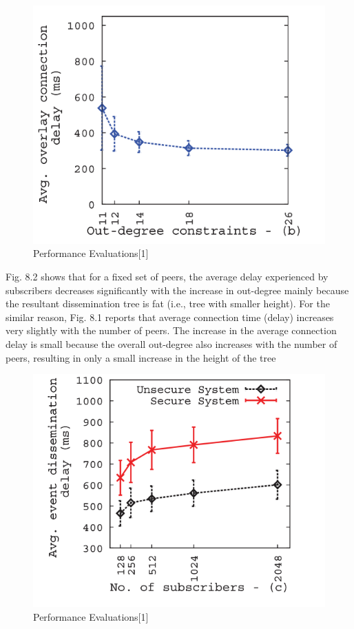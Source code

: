 \documentclass[MTech]{iitmdiss}
\begin{document}
\begin{figure}[htp]
\centering
\includegraphics[scale=0.6]{perf2.png}
\caption{\label{a}Performance Evaluations[1] }
\end{figure}
Fig. 8.2 shows that for a fixed set of peers, the average delay
experienced by subscribers decreases significantly with the
increase in out-degree mainly because the resultant dissemination tree is fat (i.e., tree with smaller height). For the
similar reason, Fig. 8.1 reports that average connection time
(delay) increases very slightly with the number of peers.
The increase in the average connection delay is small
because the overall out-degree also increases with the
number of peers, resulting in only a small increase in the
height of the tree
\begin{figure}[htp]
\centering
\includegraphics[scale=0.6]{perf3.png}
\caption{\label{a}Performance Evaluations[1] }
\end{figure}
\end{document}
